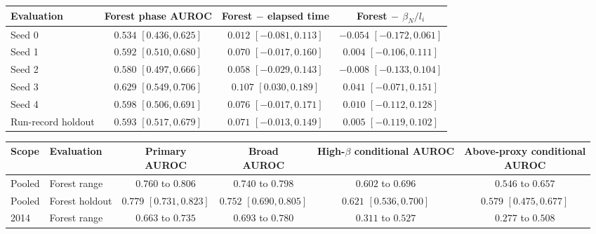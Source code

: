 \begin{table}[t]
\centering
\small
\setlength{\tabcolsep}{2pt}
\begin{tabular}{@{}lccc@{}}
\toprule
Evaluation & Forest phase AUROC & Forest $-$ elapsed time & Forest $-$ $\beta_N/l_i$ \\
\midrule
Seed 0 & $0.534$ {\scriptsize $[0.436, 0.625]$} & $0.012$ {\scriptsize $[-0.081, 0.113]$} & $-0.054$ {\scriptsize $[-0.172, 0.061]$} \\
Seed 1 & $0.592$ {\scriptsize $[0.510, 0.680]$} & $0.070$ {\scriptsize $[-0.017, 0.160]$} & $0.004$ {\scriptsize $[-0.106, 0.111]$} \\
Seed 2 & $0.580$ {\scriptsize $[0.497, 0.666]$} & $0.058$ {\scriptsize $[-0.029, 0.143]$} & $-0.008$ {\scriptsize $[-0.133, 0.104]$} \\
Seed 3 & $0.629$ {\scriptsize $[0.549, 0.706]$} & $0.107$ {\scriptsize $[0.030, 0.189]$} & $0.041$ {\scriptsize $[-0.071, 0.151]$} \\
Seed 4 & $0.598$ {\scriptsize $[0.506, 0.691]$} & $0.076$ {\scriptsize $[-0.017, 0.171]$} & $0.010$ {\scriptsize $[-0.112, 0.128]$} \\
Run-record holdout & $0.593$ {\scriptsize $[0.517, 0.679]$} & $0.071$ {\scriptsize $[-0.013, 0.149]$} & $0.005$ {\scriptsize $[-0.119, 0.102]$} \\
\bottomrule
\end{tabular}\par\vspace{5pt}
\begin{tabular}{@{}llcccc@{}}
\toprule
Scope & Evaluation & \shortstack{Primary\\AUROC} & \shortstack{Broad\\AUROC} & \shortstack{High-$\beta$ conditional\\AUROC} & \shortstack{Above-proxy conditional\\AUROC} \\
\midrule
Pooled & Forest range & $0.760$ to $0.806$ & $0.740$ to $0.798$ & $0.602$ to $0.696$ & $0.546$ to $0.657$ \\
Pooled & Forest holdout & $0.779$ {\scriptsize $[0.731, 0.823]$} & $0.752$ {\scriptsize $[0.690, 0.805]$} & $0.621$ {\scriptsize $[0.536, 0.700]$} & $0.579$ {\scriptsize $[0.475, 0.677]$} \\
2014 & Forest range & $0.663$ to $0.735$ & $0.693$ to $0.780$ & $0.311$ to $0.527$ & $0.277$ to $0.508$ \\

\end{tabular}
\end{table}
